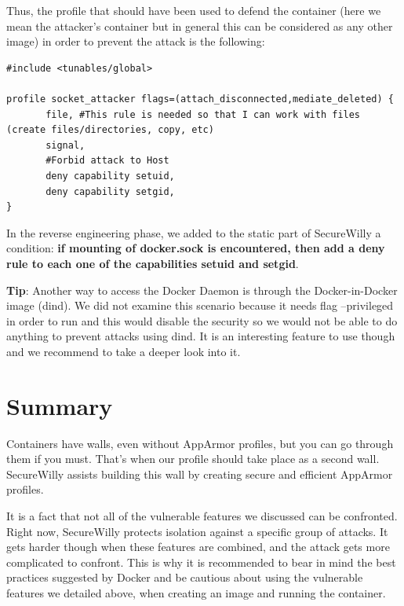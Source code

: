 Thus, the profile that should have been used to defend the container (here we mean the attacker's container but in general this can be considered as any other image) in order to prevent the attack is the following:
\hfill\break
\begin{lstlisting}[style=Dockerfile, caption={AppArmor profile socket\_attacker}]
#include <tunables/global>

profile socket_attacker flags=(attach_disconnected,mediate_deleted) {
       file, #This rule is needed so that I can work with files (create files/directories, copy, etc)
       signal,
       #Forbid attack to Host
       deny capability setuid,
       deny capability setgid,
}
\end{lstlisting}


In the reverse engineering phase, we added to the static part of SecureWilly a condition: \textbf{if mounting of docker.sock is encountered, then add a deny rule to each one of the capabilities setuid and setgid}.

\begin{mdframed}[backgroundcolor=tipcolor]
\textbf{Tip}: Another way to access the Docker Daemon is through the Docker-in-Docker image (dind). We did not examine this scenario because it needs flag --privileged in order to run and this would disable the security so we would not be able to do anything to prevent attacks using dind. It is an interesting feature to use though and we recommend to take a deeper look into it. \cite{dind}
\end{mdframed}

\section{Summary}
Containers have walls, even without AppArmor profiles, but you can go through them if you must. That's when our profile should take place as a second wall. SecureWilly assists building this wall by creating secure and efficient AppArmor profiles.

It is a fact that not all of the vulnerable features we discussed can be confronted. Right now, SecureWilly protects isolation against a specific group of attacks. It gets harder though when these features are combined, and the attack gets more complicated to confront. This is why it is recommended to bear in mind the best practices suggested by Docker \cite{dockerbestpr} and be cautious about using the vulnerable features we detailed above, when creating an image and running the container.
